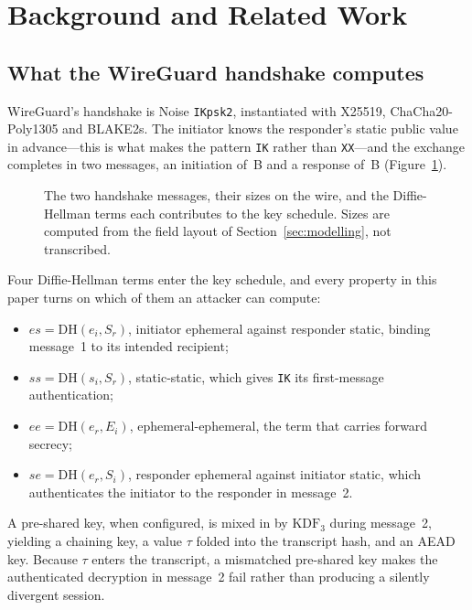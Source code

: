 \section{Background and Related Work}
\label{sec:background}

\subsection{What the WireGuard handshake computes}

WireGuard's handshake is Noise \texttt{IKpsk2}, instantiated with X25519,
ChaCha20-Poly1305 and BLAKE2s. The initiator knows the
responder's static public value in advance---this is what makes the pattern
\texttt{IK} rather than \texttt{XX}---and the exchange completes in two
messages, an initiation of \wgInitBytes\,B and a response of \wgRespBytes\,B
(Figure~\ref{fig:flow}).

\begin{figure}[t]
\centering
\resizebox{\columnwidth}{!}{}
\caption{The two handshake messages, their sizes on the wire, and the
Diffie-Hellman terms each contributes to the key schedule. Sizes are computed
from the field layout of Section~\ref{sec:modelling}, not transcribed.}
\label{fig:flow}
\end{figure}

Four Diffie-Hellman terms enter the key schedule, and every property in this
paper turns on which of them an attacker can compute:

\begin{itemize}\itemsep2pt
\item \(es=\mathrm{DH}(e_i,S_r)\), initiator ephemeral against responder
      static, binding message~1 to its intended recipient;
\item \(ss=\mathrm{DH}(s_i,S_r)\), static-static, which gives \texttt{IK} its
      first-message authentication;
\item \(ee=\mathrm{DH}(e_r,E_i)\), ephemeral-ephemeral, the term that carries
      forward secrecy;
\item \(se=\mathrm{DH}(e_r,S_i)\), responder ephemeral against initiator
      static, which authenticates the initiator to the responder in
      message~2.
\end{itemize}

A pre-shared key, when configured, is mixed in by \(\mathrm{KDF}_3\) during
message~2, yielding a chaining key, a value \(\tau\) folded into the
transcript hash, and an AEAD key. Because \(\tau\) enters the transcript, a
mismatched pre-shared key makes the authenticated decryption in message~2 fail
rather than producing a silently divergent session.

